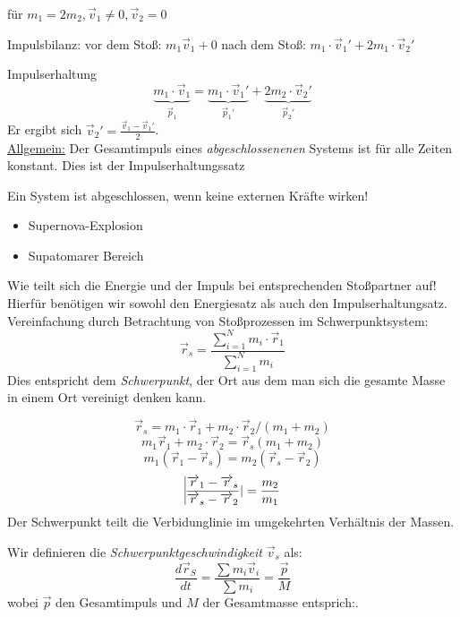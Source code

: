 \documentclass[a4paper,10pt]{scrartcl}
\begin{document}
für $m_1=2m_2, \vec v_1\neq 0, \vec v_2=0$
\begin{seg}{Impulsbilanz:}
 vor dem Stoß: $m_1\vec v_1+0$
nach dem Stoß: $m_1\cdot \vec v_1'+2m_1\cdot \vec v_2'$
\end{seg}
\begin{seg}{Impulserhaltung}
 \[
  \underbrace{m_1\cdot \vec v_1}_{\vec p_1}=\underbrace{m_1\cdot\vec v_1'}_{\vec p_1'}+\underbrace{2m_2\cdot \vec v_2'}_{\vec p_2'}
 \]
Er ergibt sich $\vec v_2'=\frac{\vec v_1-\vec v_1'}2$. \\
\underline{Allgemein:} Der Gesamtimpuls eines \emph{abgeschlossenenen} Systems ist für alle Zeiten konstant. Dies ist der Impulserhaltungssatz 
\end{seg}
\begin{note}
 Ein System ist abgeschlossen, wenn keine externen Kräfte wirken!
\end{note}
\begin{exs*}
 \begin{itemize}
  \item Supernova-Explosion
  \item Supatomarer Bereich
 \end{itemize}
\end{exs*}
 Wie teilt sich die Energie und der Impuls bei entsprechenden Stoßpartner auf! Hierfür benötigen wir sowohl den Energiesatz als auch den Impulserhaltungsatz.
Vereinfachung durch Betrachtung von Stoßprozessen im Schwerpunktsystem:\\
\fixme[Grafik]
\[
 \vec r_s=\frac{\sum_{i=1}^N m_i\cdot \vec r_1}{\sum_{i=1}^N m_i}
\]
Dies entspricht dem \emph{Schwerpunkt}, der Ort aus dem man sich die gesamte Masse in einem Ort vereinigt denken kann.
\begin{ex*}
\[
 \vec r_s=m_1\cdot \vec r_1+m_2\cdot \vec r_2/(m_1+m_2)
\]
\[
 m_1\vec r_1+m_2\cdot \vec r_2=\vec r_s(m_1+m_2)
\]
\[
 m_1(\vec r_1-\vec r_s)=m_2(\vec r_s-\vec r_2)
\]
\[
 \vline \frac{\vec r_1-\vec r_s}{\vec r_s-\vec r_2}|=\frac{m_2}{m_1}
\]
Der Schwerpunkt teilt die Verbidunglinie im umgekehrten Verhältnis der Massen.\\
\end{ex*}
\begin{df}[Schwerpunktgeschwindigkeit]
 Wir definieren die \emph{Schwerpunktgeschwindigkeit} $\vec v_s$ als:
\[
 \frac{d\vec r_S}{dt}=\frac{\sum m_i \vec v_i}{\sum m_i} = \frac{\vec p}{M}
\]
wobei $\vec p$ den Gesamtimpuls und $M$ der Gesamtmasse entsprich:.
\end{df}
\end{document}
